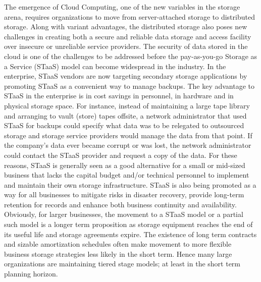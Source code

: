 \documentclass[11pt]{article}
\begin{document}
The emergence of Cloud Computing, one of the new variables in the
storage arena, requires organizations to move from server-attached
storage to distributed storage. Along with variant advantages, the
distributed storage also poses new challenges in creating both a
secure and reliable data storage and access facility over insecure or
unreliable service providers.  The security of data stored in the
cloud is one of the challenges to be addressed before the
pay-as-you-go Storage as a Service (STaaS) model can become widespread
in the industry. In the enterprise, STaaS vendors are now targeting
secondary storage applications by promoting STaaS as a convenient way
to manage backups. The key advantage to STaaS in the enterprise is in
cost savings in personnel, in hardware and in physical storage
space. For instance, instead of maintaining a large tape library and
arranging to vault (store) tapes offsite, a network administrator that
used STaaS for backups could specify what data was to be relegated to
outsourced storage and storage service providers would manage the data
from that point. If the company's data ever became corrupt or was
lost, the network administrator could contact the STaaS provider and
request a copy of the data. For these reasons, STaaS is generally seen
as a good alternative for a small or mid-sized business that lacks the
capital budget and/or technical personnel to implement and maintain
their own storage infrastructure. STaaS is also being promoted as a
way for all businesses to mitigate risks in disaster recovery, provide
long-term retention for records and enhance both business continuity
and availability. Obviously, for larger businesses, the movement to a
STaaS model or a partial such model is a longer term proposition as
storage equipment reaches the end of its useful life and storage
agreements expire. The existence of long term contracts and sizable
amortization schedules often make movement to more flexible business
storage strategies less likely in the short term. Hence many large
organizations are maintaining tiered stage models; at least in the
short term planning horizon.
\end{document}

